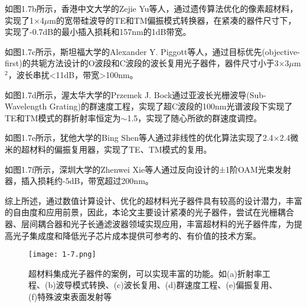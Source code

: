 如图1.7b所示，香港中文大学的Zejie Yu等人，通过遗传算法优化的像素超材料，实现了1×4$\mu$m的宽带硅波导的TE和TM偏振模式转换器，在紧凑的器件尺寸下，实现了-0.7dB的最小插入损耗和157nm的1dB带宽。\cite{Cui2017Genetic}

如图1.7c所示，斯坦福大学的Alexander Y. Piggott等人，通过目标优先(objective-first)的共轭方法设计的O波段和C波段的波长复用光子器件，器件尺寸小于3×3$\mu$m$^2$，波长串扰<11dB，带宽>100nm。\cite{Piggott2015Inverse}

如图1.7d所示，渥太华大学的Przemek J. Bock通过亚波长光栅波导(Sub-Wavelength Grating)的群速度工程，实现了超C波段的100nm光谱波段下实现了TE和TM模式的群折射率恒定为$\sim$1.5，实现了随心所欲的群速度调控。\cite{Bock2010Subwavelength}

如图1.7e所示，犹他大学的Bing Shen等人通过非线性的优化算法实现了2.4×2.4微米的超材料的偏振复用器，实现了TE、TM模式的复用。\cite{Bing2015An}

如图1.7f所示，深圳大学的Zhenwei Xie等人通过反向设计的±1阶OAM光束发射器，插入损耗约-5dB，带宽超过200nm。\cite{Xie2018Ultra}

综上所述，通过数值计算设计、优化的超材料光子器件具有较高的设计潜力，丰富的自由度和应用前景，因此，本论文主要设计紧凑的光子器件，尝试在光栅耦合器、层间耦合器和光子长通滤波器领域实现应用，丰富超材料的光子器件库，为提高光子集成度和降低光子芯片成本提供可参考的、有价值的技术方案。\cite{Zheludev2012From,Yang2015On,Shen2016Increasing,HongnanMetamaterial}

\begin{figure}[!htbp]
    \centering
    \texttt{[image: 1-7.png]}
    \caption{超材料集成光子器件的案例，可以实现丰富的功能。如(a)折射率工程、(b)波导模式转换、(c)波长复用、(d)群速度工程、(e)偏振复用、(f)特殊波束表面发射等\cite{Yang2013Ultralow,Cui2017Genetic,Piggott2015Inverse,Bock2010Subwavelength,Bing2015An,Xie2018Ultra}}
    \label{fig:1-7}
\end{figure}
